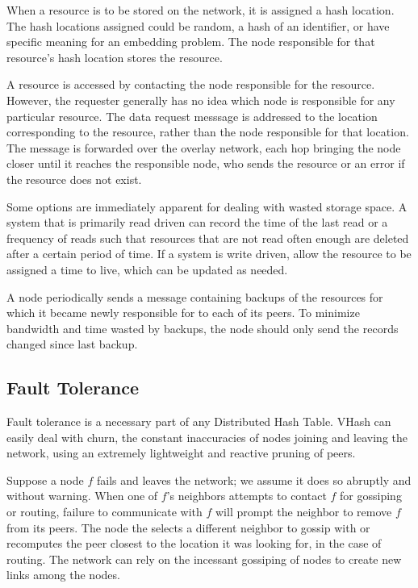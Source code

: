 \documentclass{IEEEtran}
\begin{document}
When a resource is to be stored on the network, it is assigned a hash location. The hash locations assigned could be random, a hash of an identifier, or have specific meaning for an embedding problem. The node responsible for that resource's hash location stores the resource.

A resource is accessed by contacting the node responsible for the resource.  However, the requester generally has no idea which node is responsible for any particular resource.  The data request messsage is addressed to the location corresponding to the resource, rather than the node responsible for that location.  The message is forwarded over the overlay network, each hop bringing the node closer until it reaches the responsible node, who sends the resource or an error if the resource does not exist.

Some options are immediately apparent for dealing with wasted storage space. A system that is primarily read driven can record the time of the last read or a frequency of reads such that resources that are not read often enough are deleted after a certain period of time. If a system is write driven, allow the resource to be assigned a time to live, which can be updated as needed.

A node periodically sends a message containing backups of the resources for which it became newly responsible for to each of its peers. To minimize bandwidth and time wasted by backups, the node should only send the records changed since last backup.


\subsection{Fault Tolerance}
Fault tolerance is a necessary part of any Distributed Hash Table.  VHash can easily deal with churn, the constant inaccuracies of nodes joining and leaving the network, using an extremely lightweight and reactive pruning of peers. 


Suppose a node $f$ fails and leaves the network; we assume it does so abruptly and without warning. When one of $f$'s neighbors attempts to contact $f$ for gossiping or routing, failure to communicate with $f$ will prompt the neighbor to remove $f$ from its peers.  The node the selects a different neighbor to gossip with or recomputes the peer closest to the location it was looking for, in the case of routing. The network can rely on the incessant gossiping of nodes to create new links among the nodes.
\end{document}
